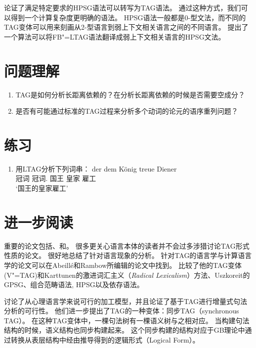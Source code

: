 \citet*{KKNV95a}论证了满足特定要求的HPSG语法可以转写为TAG语法。
通过这种方式，我们可以得到一个计算复杂度更明确的语法。
HPSG语法一般都是0-型文法，而不同的TAG变体可以用来刻画从2-型语言到弱上下文相关语言之间的不同语言\citep{Joshi85a-u}。
\citet*{YMTT2001a}提出了一个算法可以将FB"=LTAG语法翻译成弱上下文相关语言的HPSG文法。


\section*{问题理解}

\begin{enumerate}
\item TAG是如何分析长距离依赖的？在分析长距离依赖的时候是否需要空成分？
\item 是否有可能通过标准的TAG过程来分析多个动词的论元的语序重列问题？
\end{enumerate} 

\section*{练习}

\begin{enumerate}
\item 用LTAG分析下列词串：
\ea
\gll der dem König treue Diener\\
  冠词 冠词.\dat{} 国王 皇家 雇工\\
\glt `国王的皇家雇工'
\z
\end{enumerate}

\section*{进一步阅读}

重要的论文包括、和。
很多更关心语言本体的读者并不会过多涉猎讨论TAG形式性质的论文。
很好地总结了针对语言现象的分析。 
针对TAG的语言学与计算语言学的论文可以在Abeill{\'e}和Rambow\nocite{AR2000a-ed-not-crossreferenced}所编辑的论文中找到。
\citet{Rambow94a}比较了他的TAG变体(V"=TAG)和Karttunen的激进词汇主义（\emph{Radical Lexicalism}）方法、Uszkoreit的GPSG\indexgpsg、组合范畴语法\indexcg, HPSG\indexhpsg 以及依存语法\indexdg。 

\citet{SJ93a}讨论了从心理语言学来说可行的加工模型，并且论证了基于TAG进行增量式句法分析的可行性。
他们进一步提出了TAG的一种变体：同步TAG（synchronous TAG\indexstag）。
在这种TAG变体中，一棵句法树有一棵语义树与之相对应。
当构建句法结构的时候，语义结构也同步构建起来。
这个同步构建的结构对应于GB理论中通过转换从表层结构中经由推导得到的逻辑形式（Logical Form）。


